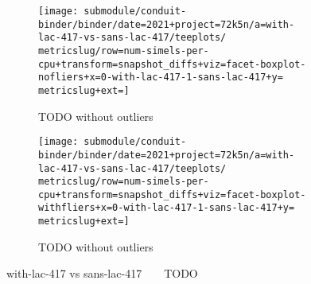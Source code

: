 \begin{figure*}
  \centering
  \begin{subfigure}[b]{0.5\textwidth}
    \centering
    \texttt{[image: submodule/conduit-binder/binder/date=2021+project=72k5n/a=with-lac-417-vs-sans-lac-417/teeplots/\\metricslug/row=num-simels-per-cpu+transform=snapshot\_diffs+viz=facet-boxplot-nofliers+x=0-with-lac-417-1-sans-lac-417+y=\\metricslug+ext=]}
    \caption{TODO without outliers}
    \label{fig:with-lac-417-vs-sans-lac-417-distribution-\metricslug-nofliers}
  \end{subfigure}%
  \begin{subfigure}[b]{0.5\textwidth}
    \centering
    \texttt{[image: submodule/conduit-binder/binder/date=2021+project=72k5n/a=with-lac-417-vs-sans-lac-417/teeplots/\\metricslug/row=num-simels-per-cpu+transform=snapshot\_diffs+viz=facet-boxplot-withfliers+x=0-with-lac-417-1-sans-lac-417+y=\\metricslug+ext=]}
    \caption{TODO without outliers}
    \label{fig:with-lac-417-vs-sans-lac-417-distribution-\metricslug-withfliers}
  \end{subfigure}
  \caption{with-lac-417 vs sans-lac-417 ~ \metric ~ TODO}
  \label{fig:with-lac-417-vs-sans-lac-417-distribution-\metricslug}
\end{figure*}
